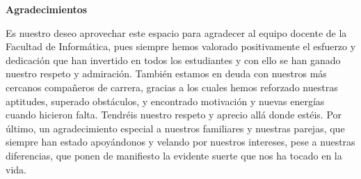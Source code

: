 
\newpage
\begin{center}
{\bf \Huge Agradecimientos}
\end{center}
\vspace{1cm}
\setlength{\baselineskip}{0.8cm}



Es nuestro deseo aprovechar este espacio para agradecer al equipo docente de la Facultad de Informática, pues siempre hemos valorado positivamente el esfuerzo y dedicación que han invertido en todos los estudiantes y con ello se han ganado nuestro respeto y admiración. También estamos en deuda con nuestros más cercanos compañeros de carrera, gracias a los cuales hemos reforzado nuestras aptitudes, superado obstáculos, y encontrado motivación y nuevas energías cuando hicieron falta. Tendréis nuestro respeto y aprecio allá donde estéis. Por último, un agradecimiento especial a nuestros familiares y nuestras parejas, que siempre han estado apoyándonos y velando por nuestros intereses, pese a nuestras diferencias, que ponen de manifiesto la evidente suerte que nos ha tocado en la vida.

